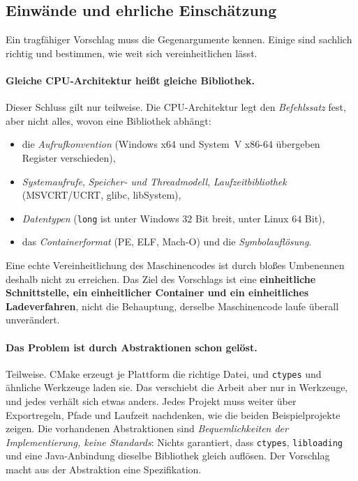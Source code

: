\subsection{Einwände und ehrliche Einschätzung}
\label{sec:sl_einwaende}

Ein tragfähiger Vorschlag muss die Gegenargumente kennen. Einige sind sachlich richtig und bestimmen, wie weit sich vereinheitlichen lässt.

\paragraph{\glqq Gleiche CPU-Architektur heißt gleiche Bibliothek.\grqq} Dieser Schluss gilt nur teilweise. Die CPU-Architektur legt den \emph{Befehlssatz} fest, aber nicht alles, wovon eine Bibliothek abhängt:

\begin{itemize}
	\item die \emph{Aufrufkonvention} (Windows x64 und System~V x86-64 übergeben Register verschieden),
	\item \emph{Systemaufrufe}, \emph{Speicher- und Threadmodell}, \emph{Laufzeitbibliothek} (MSVCRT/UCRT, glibc, libSystem),
	\item \emph{Datentypen} (\texttt{long} ist unter Windows $32$ Bit breit, unter Linux $64$ Bit),
	\item das \emph{Containerformat} (PE, ELF, Mach-O) und die \emph{Symbolauflösung}.
\end{itemize}

Eine echte Vereinheitlichung des Maschinencodes ist durch bloßes Umbenennen deshalb nicht zu erreichen. Das Ziel des Vorschlags ist eine \textbf{einheitliche Schnittstelle, ein einheitlicher Container und ein einheitliches Ladeverfahren}, nicht die Behauptung, derselbe Maschinencode laufe überall unverändert.

\paragraph{\glqq Das Problem ist durch Abstraktionen schon gelöst.\grqq} Teilweise. CMake erzeugt je Plattform die richtige Datei, und \texttt{ctypes} und ähnliche Werkzeuge laden sie. Das verschiebt die Arbeit aber nur in Werkzeuge, und jedes verhält sich etwas anders. Jedes Projekt muss weiter über Exportregeln, Pfade und Laufzeit nachdenken, wie die beiden Beispielprojekte zeigen. Die vorhandenen Abstraktionen sind \emph{Bequemlichkeiten der Implementierung, keine Standards}: Nichts garantiert, dass \texttt{ctypes}, \texttt{libloading} und eine Java-Anbindung dieselbe Bibliothek gleich auflösen. Der Vorschlag macht aus der Abstraktion eine Spezifikation.

